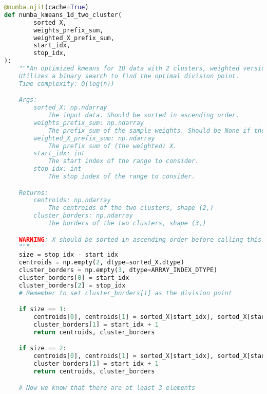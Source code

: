 \begin{lstlisting}[language=Python]
@numba.njit(cache=True)
def numba_kmeans_1d_two_cluster(
        sorted_X,
        weights_prefix_sum,
        weighted_X_prefix_sum,
        start_idx,
        stop_idx,
):
    """An optimized kmeans for 1D data with 2 clusters, weighted version.
    Utilizes a binary search to find the optimal division point.
    Time complexity: O(log(n))

    Args:
        sorted_X: np.ndarray
            The input data. Should be sorted in ascending order.
        weights_prefix_sum: np.ndarray
            The prefix sum of the sample weights. Should be None if the data is unweighted.
        weighted_X_prefix_sum: np.ndarray
            The prefix sum of (the weighted) X.
        start_idx: int
            The start index of the range to consider.
        stop_idx: int
            The stop index of the range to consider.

    Returns:
        centroids: np.ndarray
            The centroids of the two clusters, shape (2,)
        cluster_borders: np.ndarray
            The borders of the two clusters, shape (3,)

    WARNING: X should be sorted in ascending order before calling this function.
    """
    size = stop_idx - start_idx
    centroids = np.empty(2, dtype=sorted_X.dtype)
    cluster_borders = np.empty(3, dtype=ARRAY_INDEX_DTYPE)
    cluster_borders[0] = start_idx
    cluster_borders[2] = stop_idx
    # Remember to set cluster_borders[1] as the division point

    if size == 1:
        centroids[0], centroids[1] = sorted_X[start_idx], sorted_X[start_idx]
        cluster_borders[1] = start_idx + 1
        return centroids, cluster_borders

    if size == 2:
        centroids[0], centroids[1] = sorted_X[start_idx], sorted_X[start_idx + 1]
        cluster_borders[1] = start_idx + 1
        return centroids, cluster_borders

    # Now we know that there are at least 3 elements


\end{lstlisting}
